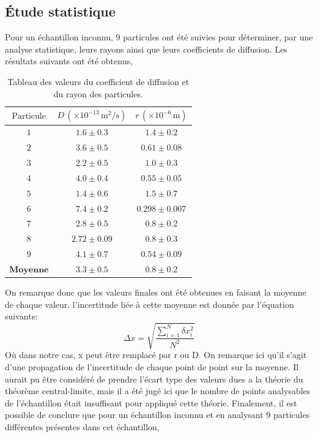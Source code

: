 \documentclass[11pt,letterpaper]{article}
\begin{document}
\subsection{Étude statistique}
Pour un échantillon inconnu, 9 particules ont été suivies pour déterminer, par une analyse statistique, leurs rayons ainsi que leurs coefficients de diffusion. 
Les résultats suivants ont été obtenus,
\begin{table}[h!]
  \centering
  \begin{tabular}{|c|c|c|}
  \hline
  \( \text{Particule} \) &\( D \, (\times 10^{-13} \, \text{m}^2/\text{s}) \) & \( r \, (\times 10^{-6} \, \text{m}) \) \\
  \hline
  \( 1 \) &\( 1.6 \pm 0.3 \) & \( 1.4 \pm 0.2 \) \\
  \( 2 \) &\( 3.6 \pm 0.5 \) & \( 0.61 \pm 0.08 \) \\
  \( 3 \) &\( 2.2 \pm 0.5 \) & \( 1.0 \pm 0.3 \) \\
  \( 4 \) &\( 4.0 \pm 0.4 \) & \( 0.55 \pm 0.05 \) \\
  \( 5 \) &\( 1.4 \pm 0.6 \) & \( 1.5 \pm 0.7 \) \\
  \( 6 \) &\( 7.4 \pm 0.2 \) & \( 0.298 \pm 0.007 \) \\
  \( 7 \) &\( 2.8 \pm 0.5 \) & \( 0.8 \pm 0.2 \) \\
  \( 8 \) &\( 2.72 \pm 0.09 \) & \( 0.8 \pm 0.3 \) \\
  \( 9 \) &\( 4.1 \pm 0.7 \) & \( 0.54 \pm 0.09 \) \\
  \hline
  \hline
  \( \textbf{Moyenne} \) & \( \mathbf{3.3 \pm 0.5} \) & \( \mathbf{0.8 \pm 0.2} \) \\
  \hline
  \end{tabular}
  \caption{Tableau des valeurs du coefficient de diffusion et du rayon des particules.}
\end{table}
On remarque donc que les valeurs finales ont été obtenues en faisant la moyenne de chaque valeur. l'incertitude liée à cette moyenne est donnée
par l'équation suivante: 
\[
  \Delta x = \sqrt{\frac{\sum_{i=1}^N \delta x_{i}^2}{N^2}}
\]
Où dans notre cas, x peut être remplacé par r ou D. On remarque ici qu'il s'agit d'une propagation de l’incertitude de chaque point de point sur la 
moyenne. Il aurait pu être considéré de prendre l'écart type des valeurs dues a la théorie du théorème central-limite, mais il a été jugé ici que le nombre de points 
analysables de l’échantillon était insuffisant pour appliqué cette théorie. 
Finalement, il est possible de conclure que pour un échantillon inconnu et en analysant 9 particules différentes présentes dans cet échantillon, 
\end{document}
